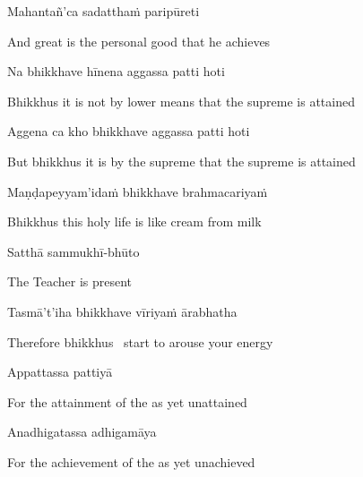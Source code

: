Mahantañ'ca sadatthaṁ paripūreti

\begin{english}
  And great is the personal good that he achieves
\end{english}

Na bhikkhave hīnena aggassa patti hoti

\begin{english-hang}
  Bhikkhus it is not by lower means that the supreme is attained
\end{english-hang}

\ifafive\clearpage\fi

Aggena ca kho bhikkhave aggassa patti hoti

\ifbfive\enlargethispage{1\baselineskip}\fi

\begin{english-hang}
  But bhikkhus it is by the supreme that the supreme is attained
\end{english-hang}

Maṇḍapeyyam'idaṁ bhikkhave brahmacariyaṁ

\begin{english}
  Bhikkhus this holy life is like cream from milk\ifdigital\makeatletter\hyperlink{endnote89-appendix}\makeatother\fi
\end{english}

Satthā sammukhī-bhūto

\begin{english}
  The Teacher is present
\end{english}

Tasmā't'iha bhikkhave vīriyaṁ ārabhatha

\begin{english}
  Therefore bhikkhus \breathmark\ start to arouse your energy
\end{english}

Appattassa pattiyā

\begin{english}
  For the attainment of the as yet unattained
\end{english}

Anadhigatassa adhigamāya

\begin{english}
  For the achievement of the as yet unachieved
\end{english}


